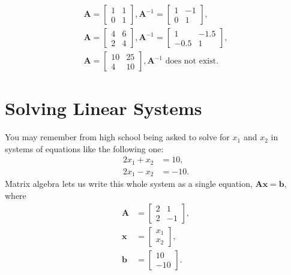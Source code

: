 \documentclass[12pt,oneside,openany]{book}
\begin{document}
\[
\begin{gathered}
\mathbf{A} = \begin{bmatrix}
1 & 1 \\
0 & 1
\end{bmatrix},
\mathbf{A}^{-1} = \begin{bmatrix}
1 & -1 \\
0 & 1
\end{bmatrix}, \\
\mathbf{A} = \begin{bmatrix}
4 & 6 \\
2 & 4
\end{bmatrix},
\mathbf{A}^{-1} = \begin{bmatrix}
1 & -1.5 \\
-0.5 & 1
\end{bmatrix}, \\
\mathbf{A} = \begin{bmatrix}
10 & 25 \\
4 & 10
\end{bmatrix},
\text{$\mathbf{A}^{-1}$ does not exist}.
\end{gathered}
\]

\section{Solving Linear Systems}\label{solving-linear-systems}

You may remember from high school being asked to solve for \(x_1\) and
\(x_2\) in systems of equations like the following one: \[
\begin{aligned}
2 x_1 + x_2 &= 10, \\
2 x_1 - x_2 &= -10.
\end{aligned}
\] Matrix algebra lets us write this whole system as a single equation,
\(\mathbf{A} \mathbf{x} = \mathbf{b}\), where \[
\begin{aligned}
\mathbf{A} &= \begin{bmatrix}
2 & 1 \\
2 & -1
\end{bmatrix}, \\
\mathbf{x} &= \begin{bmatrix} x_1 \\ x_2 \end{bmatrix}, \\
\mathbf{b} &= \begin{bmatrix} 10 \\ -10 \end{bmatrix}.
\end{aligned}
\]
\end{document}
